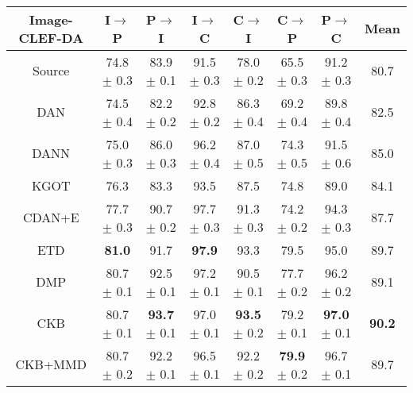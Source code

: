 \documentclass[final]{cvpr}
\begin{document}
\begin{table*}[t]
\\[2pt]
\renewcommand{\tabcolsep}{0.58pc}
\begin{tabular}{c|cccccc|c}
\toprule[1pt]
\textbf{Image-CLEF-DA} & I$\to$P & P$\to$I &
I$\to$C & C$\to$I &
C$\to$P & P$\to$C & Mean \\
\hline
Source \cite{he2016deep} & 74.8 $\pm$ 0.3 & 83.9 $\pm$ 0.1 & 91.5 $\pm$ 0.3 & 78.0 $\pm$ 0.2 & 65.5 $\pm$ 0.3 & 91.2 $\pm$ 0.3 & 80.7 \\
DAN \cite{long2015learning} & 74.5 $\pm$ 0.4 & 82.2 $\pm$ 0.2 & 92.8 $\pm$ 0.2 & 86.3 $\pm$ 0.4 & 69.2 $\pm$ 0.4 & 89.8 $\pm$ 0.4 & 82.5 \\				
DANN \cite{ganin2016domain} & 75.0 $\pm$ 0.3 & 86.0 $\pm$ 0.3 & 96.2 $\pm$ 0.4 & 87.0 $\pm$ 0.5 & 74.3 $\pm$ 0.5 & 91.5 $\pm$ 0.6 & 85.0 \\
KGOT \cite{zhang2019optimal} & 76.3 & 83.3 & 93.5 & 87.5 & 74.8 & 89.0 & 84.1 \\
CDAN+E \cite{long2018conditional} & 77.7 $\pm$ 0.3 & 90.7 $\pm$ 0.2 & 97.7 $\pm$ 0.3 & 91.3 $\pm$ 0.3 & 74.2 $\pm$ 0.2 & 94.3 $\pm$ 0.3 & 87.7 \\
ETD \cite{li2020Enhanced} & \textbf{81.0} & 91.7 & \textbf{97.9} & 93.3 & 79.5 & 95.0 & 89.7 \\
DMP \cite{luo2020unsupervised} & 80.7 $\pm$ 0.1 & 92.5 $\pm$ 0.1 & 97.2 $\pm$ 0.1 & 90.5 $\pm$ 0.1 & 77.7 $\pm$ 0.2 & 96.2 $\pm$ 0.2 & 89.1 \\
\hline
CKB & 80.7 $\pm$ 0.1 & \textbf{93.7} $\pm$ 0.1 & 97.0 $\pm$ 0.1 & \textbf{93.5} $\pm$ 0.2 & 79.2 $\pm$ 0.1 & \textbf{97.0} $\pm$ 0.1 & \textbf{90.2} \\
CKB+MMD & 80.7 $\pm$ 0.2 & 92.2 $\pm$ 0.1 & 96.5 $\pm$ 0.1 & 92.2 $\pm$ 0.2 & \textbf{79.9} $\pm$ 0.2 & 96.7 $\pm$ 0.1 & 89.7 \\
\bottomrule[1pt]
\end{tabular}
\\[2pt]
\renewcommand{\tabcolsep}{0.26pc}
\begin{tabular}{c|cccccccccccc|c}
\toprule[1pt]

\end{tabular}
\end{table*}
\end{document}
